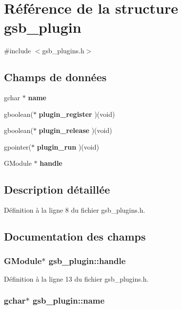 \section{Référence de la structure gsb\_\-plugin}
\label{structgsb__plugin}


{\ttfamily \#include $<$gsb\_\-plugins.h$>$}

\subsection*{Champs de données}
\begin{DoxyCompactItemize}
\item 
gchar $\ast$ {\bf name}
\item 
gboolean($\ast$ {\bf plugin\_\-register} )(void)
\item 
gboolean($\ast$ {\bf plugin\_\-release} )(void)
\item 
gpointer($\ast$ {\bf plugin\_\-run} )(void)
\item 
GModule $\ast$ {\bf handle}
\end{DoxyCompactItemize}


\subsection{Description détaillée}


Définition à la ligne 8 du fichier gsb\_\-plugins.h.



\subsection{Documentation des champs}
\subsubsection[{handle}]{\setlength{\rightskip}{0pt plus 5cm}GModule$\ast$ {\bf gsb\_\-plugin::handle}}\label{structgsb__plugin_ae72a08879df2449a2c7b635d6a132ae3}


Définition à la ligne 13 du fichier gsb\_\-plugins.h.

\subsubsection[{name}]{\setlength{\rightskip}{0pt plus 5cm}gchar$\ast$ {\bf gsb\_\-plugin::name}}\label{structgsb__plugin_a167c0b4d73ae1612adc221afe760d675}


